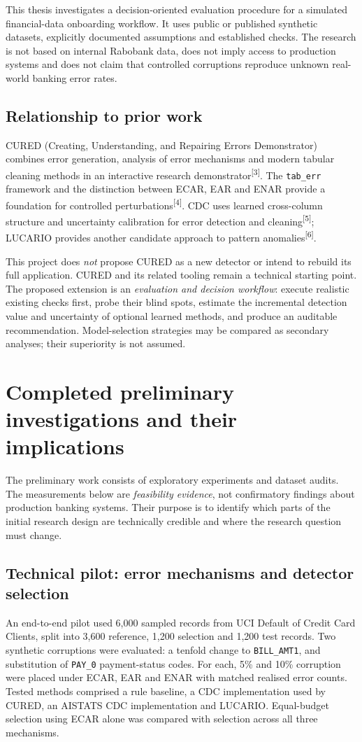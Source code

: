 \documentclass[10pt,a4paper]{article}
\newcommand{\rf}[1]{\textsuperscript{[#1]}}
\begin{document}
This thesis investigates a decision-oriented evaluation procedure for a simulated financial-data onboarding workflow. It uses public or published synthetic datasets, explicitly documented assumptions and established checks. The research is not based on internal Rabobank data, does not imply access to production systems and does not claim that controlled corruptions reproduce unknown real-world banking error rates.

\subsection{Relationship to prior work}
CURED (Creating, Understanding, and Repairing Errors Demonstrator) combines error generation, analysis of error mechanisms and modern tabular cleaning methods in an interactive research demonstrator\rf{3}. The \texttt{tab\_err} framework and the distinction between ECAR, EAR and ENAR provide a foundation for controlled perturbations\rf{4}. CDC uses learned cross-column structure and uncertainty calibration for error detection and cleaning\rf{5}; LUCARIO provides another candidate approach to pattern anomalies\rf{6}.

This project does \emph{not} propose CURED as a new detector or intend to rebuild its full application. CURED and its related tooling remain a technical starting point. The proposed extension is an \emph{evaluation and decision workflow}: execute realistic existing checks first, probe their blind spots, estimate the incremental detection value and uncertainty of optional learned methods, and produce an auditable recommendation. Model-selection strategies may be compared as secondary analyses; their superiority is not assumed.

\section{Completed preliminary investigations and their implications}
The preliminary work consists of exploratory experiments and dataset audits. The measurements below are \emph{feasibility evidence}, not confirmatory findings about production banking systems. Their purpose is to identify which parts of the initial research design are technically credible and where the research question must change.

\subsection{Technical pilot: error mechanisms and detector selection}
An end-to-end pilot used 6,000 sampled records from UCI Default of Credit Card Clients, split into 3,600 reference, 1,200 selection and 1,200 test records. Two synthetic corruptions were evaluated: a tenfold change to \texttt{BILL\_AMT1}, and substitution of \texttt{PAY\_0} payment-status codes. For each, 5\% and 10\% corruption were placed under ECAR, EAR and ENAR with matched realised error counts. Tested methods comprised a rule baseline, a CDC implementation used by CURED, an AISTATS CDC implementation and LUCARIO. Equal-budget selection using ECAR alone was compared with selection across all three mechanisms.
\end{document}
